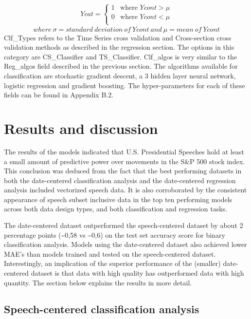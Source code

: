 \documentclass[11pt,preprint, authoryear]{elsarticle}
\numberwithin{equation}{section}
\numberwithin{figure}{section}
\numberwithin{table}{section}
\begin{document}
\begin{align}
Ycat=   \left\{ 
\begin{array}{ll} 
      1  &\text{where } Ycont>\mu \label{eq2} \\
      0  &\text{where } Ycont<\mu \\
\end{array} 
\right. 
\end{align} \[
where \ \sigma = standard \ deviation \ of \ Ycont \ and \ \mu = mean \ of \ Ycont
\] Clf\_Types refers to the Time Series cross validation and
Cross-section cross validation methods as described in the regression
section. The options in this category are CS\_Classifier and
TS\_Classifier. Clf\_algos is very similar to the Reg\_algos field
described in the previous section. The algorithms available for
classification are stochastic gradient descent, a 3 hidden layer neural
network, logistic regression and gradient boosting. The hyper-parameters
for each of these fields can be found in Appendix B.2.

\hypertarget{results-and-discussion}{%
\section{Results and discussion}\label{results-and-discussion}}

The results of the models indicated that U.S. Presidential Speeches hold
at least a small amount of predictive power over movements in the S\&P
500 stock index. This conclusion was deduced from the fact that the best
performing datasets in both the date-centered classification analysis
and the date-centered regression analysis included vectorized speech
data. It is also corroborated by the consistent appearance of speech
subset inclusive data in the top ten performing models across both data
design types, and both classification and regression tasks.

The date-centered dataset outperformed the speech-centered dataset by
about 2 percentage points (\textasciitilde0,58 vs \textasciitilde0,6) on
the test set accuracy score for binary classification analysis. Models
using the date-centered dataset also achieved lower MAE's than models
trained and tested on the speech-centered dataset. Interestingly, an
implication of the superior performance of the (smaller) date-centered
dataset is that data with high quality has outperformed data with high
quantity. The section below explains the results in more detail.

\hypertarget{speech-centered-classification-analysis}{%
\subsection{Speech-centered classification
analysis}\label{speech-centered-classification-analysis}}
\end{document}
